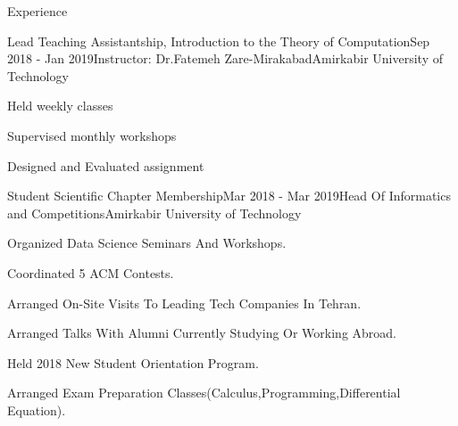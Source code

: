 \documentclass{resume} %
\begin{document}
\begin{rSection}{Experience}
		\begin{rSubsection}{Lead Teaching Assistantship, Introduction to the Theory of Computation}{Sep 2018 - Jan 2019}{Instructor: Dr.Fatemeh Zare-Mirakabad}{Amirkabir University of Technology}
			\item Held weekly classes 
			\item Supervised monthly workshops
			\item Designed and Evaluated assignment 
			
		\end{rSubsection}
		
		
		\begin{rSubsection}{Student Scientific Chapter Membership}{Mar 2018 - Mar  2019}{Head Of Informatics and Competitions}{Amirkabir University of Technology}
			\item Organized Data Science Seminars And Workshops.
			\item Coordinated 5 ACM Contests.
			\item Arranged On-Site Visits To Leading Tech Companies In Tehran.
			\item Arranged Talks With Alumni Currently Studying Or Working Abroad.
			\item Held 2018 New Student Orientation Program.
			\item Arranged Exam Preparation Classes(Calculus,Programming,Differential Equation).
		\end{rSubsection}
		
		
	\end{rSection}
	
\end{document}
